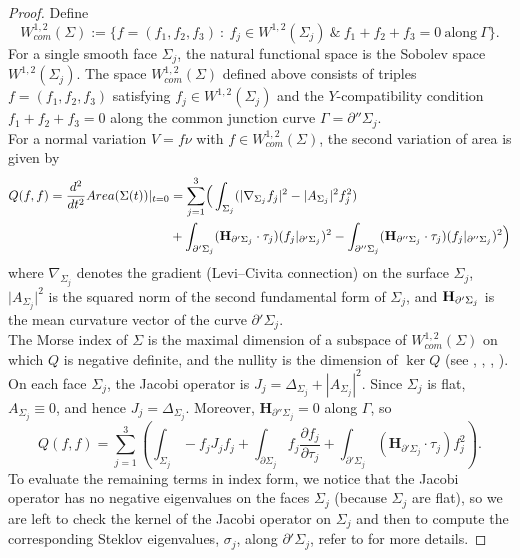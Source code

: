 \documentclass[11pt]{amsart}
\numberwithin{equation}{section}
\theoremstyle{theorem}
\theoremstyle{definition}
\numberwithin{equation}{section}
\begin{document}
\begin{proof}
Define 
$$W_{com}^{1,2}(\Sigma) := \{ f=(f_1,f_2,f_3)\ :\ f_j  \in W^{1,2}(\Sigma_j)\ \& \ f_1+f_2+f_3=0\ \text{along}\  \Gamma \}.$$
For a single smooth face $\Sigma_j$, the natural functional space is the Sobolev space $W^{1,2}(\Sigma_j)$. 
The space $W^{1,2}_{com}(\Sigma)$ defined above consists of triples 
$f=(f_1,f_2,f_3)$ satisfying $f_j\in W^{1,2}(\Sigma_j)$ and the $Y$-compatibility condition 
$f_1+f_2+f_3=0$ along the common junction curve $\Gamma = \partial''\Sigma_j$.\\
For a normal variation $V = f\nu$ with $f \in W_{com}^{1,2}(\Sigma)$, the second variation of area is given by
\begin{equation} \label{eqn: 2nd variation fromula}
\begin{split}
   Q(f , f) = \frac{d^2}{dt^2} Area (\Sigma (t))\vert_{t=0} &=  \underset{j=1}{\overset{3}{\sum}} \Big ( \int_{\Sigma_j} (\vert \nabla_{\Sigma_j} f_j \vert^2 - \vert A_{\Sigma_j} \vert^2 f_j^2)  \\
   & +  \int_{\partial' \Sigma_j  }    (\bold{H}_{\partial' \Sigma_j} \cdot \tau_j) (f_j \vert_{\partial' \Sigma_j} )^2   - \int_{\partial'' \Sigma_j  }    (\bold{H}_{\partial'' \Sigma_j} \cdot \tau_j) (f_j \vert_{\partial'' \Sigma_j} )^2 \Big) 
   \end{split}
\end{equation}
where $\nabla_{\Sigma_j}$ denotes the gradient (Levi–Civita connection) on the surface $\Sigma_j$, $\vert A_{\Sigma_j} \vert^2$ is the squared norm of the second fundamental form of $\Sigma_j$, and $\bold{H}_{\partial' \Sigma_j}$ is the mean curvature vector of the curve $\partial' \Sigma_j$. \\
\label{def: Morse Index}The Morse index of $\Sigma$ is the maximal dimension of a subspace of $W_{com}^{1,2}(\Sigma)$ on which $Q$ is negative definite, and the nullity is the dimension of $\ker Q$ 
(see \cite{fraser2016sharp}, \cite{tran2016index}, \cite{wang2022curvature}, \cite{matinpour2024morse}).\\
On each face $\Sigma_j$, the Jacobi operator is $J_j = \Delta_{\Sigma_j} + |A_{\Sigma_j}|^2$. 
Since $\Sigma_j$ is flat, $A_{\Sigma_j} \equiv 0$, and hence $J_j = \Delta_{\Sigma_j}$. 
Moreover, $\mathbf{H}_{\partial'' \Sigma_j} = 0$ along $\Gamma$, so
\[
Q(f,f)
= \sum_{j=1}^3 \left(
\int_{\Sigma_j} - f_j J_j f_j
+ \int_{\partial \Sigma_j} f_j \frac{\partial f_j}{\partial \tau_j}
+ \int_{\partial' \Sigma_j} (\mathbf{H}_{\partial'\Sigma_j}\!\cdot\!\tau_j) f_j^2
\right).
\]
To evaluate the remaining terms in index form, we notice that the Jacobi operator has no negative eigenvalues on the faces $\Sigma_j$ (because $\Sigma_j$ are flat), so we are left to check the kernel of the Jacobi operator on $\Sigma_j$ and then to compute the corresponding Steklov eigenvalues, $\sigma_j$, along $\partial' \Sigma_j$, refer to \cite{matinpour2024morse} for more details.
\medskip


\end{proof}
\end{document}
